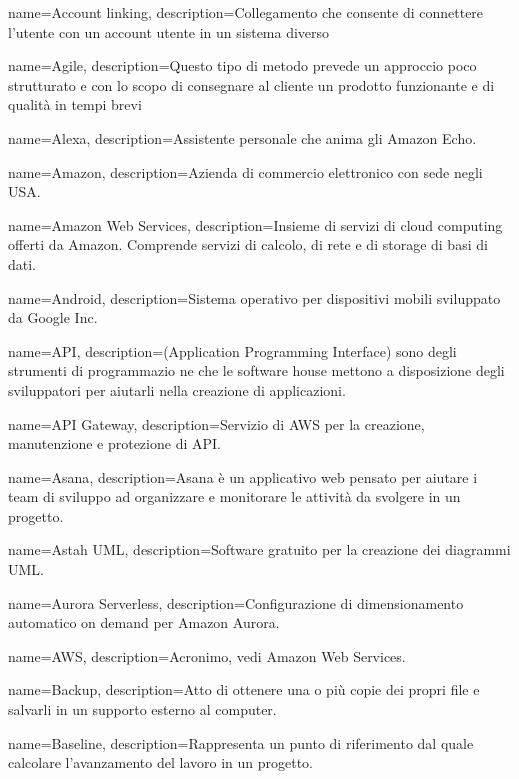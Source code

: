 {
name={Account linking},
description={Collegamento che consente di connettere l’utente con un account utente in
un sistema diverso}
}

{
name={Agile},
description={Questo tipo di metodo prevede un approccio poco strutturato e con lo scopo
di consegnare al cliente un prodotto funzionante e di qualità in tempi brevi}
}

{
name={Alexa},
description={Assistente personale che anima gli Amazon Echo.}
}

{
name={Amazon},
description={Azienda di commercio elettronico con sede negli USA.}
}

{
name={Amazon Web Services},
description={Insieme di servizi di cloud computing offerti da Amazon. Comprende servizi di calcolo, di rete e di storage di basi di dati.}
}

{
name={Android},
description={Sistema operativo per dispositivi mobili sviluppato da Google Inc.}
}

{
name={API},
description={(Application Programming Interface) sono degli strumenti di programmazio
ne che le software house mettono a disposizione degli sviluppatori per aiutarli
nella creazione di applicazioni.}
}

{
name={API Gateway},
description={Servizio di AWS per la creazione, manutenzione e protezione di API.}
}

{
name={Asana},
description={Asana è un applicativo web pensato per aiutare i team di sviluppo ad organizzare e monitorare le attività da svolgere in un progetto.}
}

{
name={Astah UML},
description={Software gratuito per la creazione dei diagrammi UML.}
}

{
name={Aurora Serverless},
description={Configurazione di dimensionamento automatico on demand per Amazon Aurora.}
}

{
name={AWS},
description={Acronimo, vedi Amazon Web Services.}
}

{
name={Backup},
description={Atto di ottenere una o più copie dei propri file e salvarli in un supporto esterno al computer.}
}

{
name={Baseline},
description={Rappresenta un punto di riferimento dal quale calcolare l’avanzamento del lavoro in un progetto.}
}

